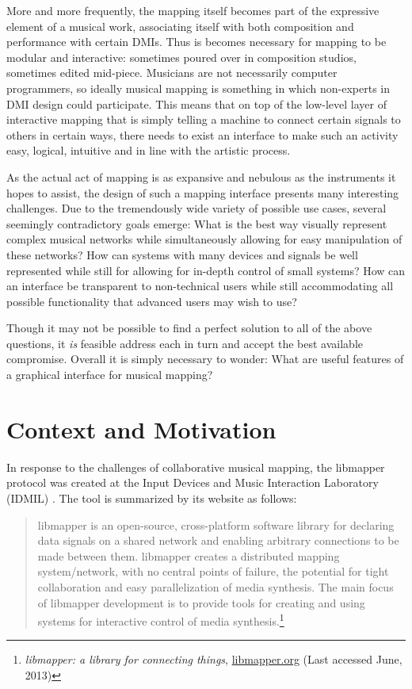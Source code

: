 More and more frequently, the mapping itself becomes part of the expressive element of a musical work, %
associating itself with both composition and performance with certain DMIs. Thus is becomes necessary for mapping to be modular and interactive: sometimes poured over in composition studios, sometimes edited mid-piece. Musicians are not necessarily computer programmers, so ideally musical mapping is something in which non-experts in DMI design could participate. This means that on top of the low-level layer of interactive mapping that is simply telling a machine to connect certain signals to others in certain ways, there needs to exist an interface to make such an activity easy, logical, intuitive and in line with the artistic process.

As the actual act of mapping is as expansive and nebulous as the instruments it hopes to assist, the design of such a mapping interface presents many interesting challenges. Due to the tremendously wide variety of possible use cases, several seemingly contradictory goals emerge: What is the best way visually represent complex musical networks while simultaneously allowing for easy manipulation of these networks? How can systems with many devices and signals be well represented while still for allowing for in-depth control of small systems? How can an interface be transparent to non-technical users while still accommodating all possible functionality that advanced users may wish to use? 

Though it may not be possible to find a perfect solution to all of the above questions, it \emph{is} feasible address each in turn and accept the best available compromise. Overall it is simply necessary to wonder: What are useful features of a graphical interface for musical mapping?

\section{Context and Motivation}

In response to the challenges of collaborative musical mapping, the libmapper protocol was created at the Input Devices and Music Interaction Laboratory (IDMIL) . The tool is summarized by its website as follows:

\begin{quote} 
libmapper is an open-source, cross-platform software library for declaring data signals on a shared network and enabling arbitrary connections to be made between them. libmapper creates a distributed mapping system/network, with no central points of failure, the potential for tight collaboration and easy parallelization of media synthesis. The main focus of libmapper development is to provide tools for creating and using systems for interactive control of media synthesis.\footnote{\emph{libmapper: a library for connecting things}, \url{libmapper.org} (Last accessed June, 2013)}
\end{quote}

